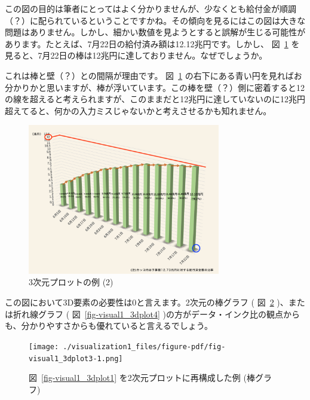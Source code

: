 \documentclass[
  a4paper,
  pandoc,
  ja=standard,
  jafont=haranoaji]{bxjsbook}
\begin{document}
この図の目的は筆者にとってはよく分かりませんが、少なくとも給付金が順調（？）に配られているということですかね。その傾向を見るにはこの図は大きな問題はありません。しかし、細かい数値を見ようとすると誤解が生じる可能性があります。たとえば、7月22日の給付済み額は12.12兆円です。しかし、
図~\ref{fig-visual1_3dplot2}
を見ると、7月22日の棒は12兆円に達しておりません。なぜでしょうか。

これは棒と壁（？）との間隔が理由です。 図~\ref{fig-visual1_3dplot2}
の右下にある青い円を見ればお分かりかと思いますが、棒が浮いています。この棒を壁（？）側に密着すると12の線を超えると考えられますが、このままだと12兆円に達していないのに12兆円超えてると、何かの入力ミスじゃないかと考えさせるかも知れません。

\begin{figure}

{\centering \includegraphics[width=0.75\textwidth,height=\textheight]{./Figs/Visualization1/garbage_graph2.png}

}

\caption{\label{fig-visual1_3dplot2}3次元プロットの例 (2)}

\end{figure}

この図において3D要素の必要性は0と言えます。2次元の棒グラフ (
図~\ref{fig-visual1_3dplot3} )、または折れ線グラフ (
図~\ref{fig-visual1_3dplot4}
)の方がデータ・インク比の観点からも、分かりやすさからも優れていると言えるでしょう。

\begin{figure}

{\centering \texttt{[image: ./visualization1\_files/figure-pdf/fig-visual1\_3dplot3-1.png]}

}

\caption{\label{fig-visual1_3dplot3}図~\ref{fig-visual1_3dplot1}
を2次元プロットに再構成した例 (棒グラフ)}

\end{figure}
\end{document}
